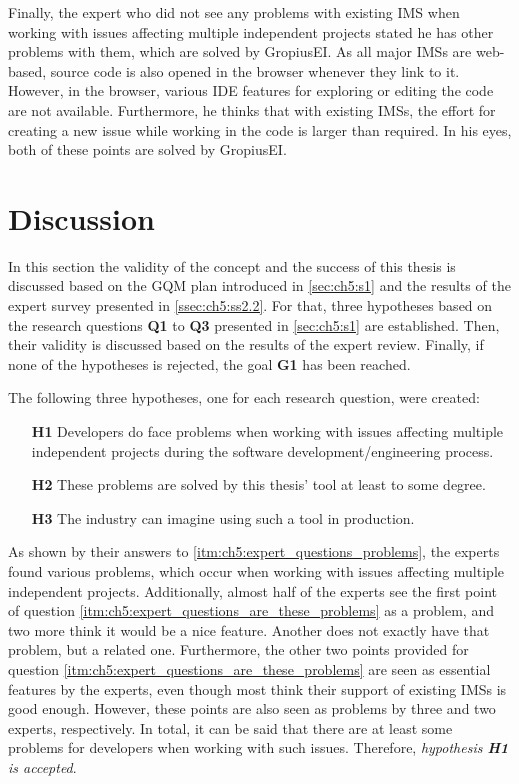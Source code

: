 Finally, the expert who did not see any problems with existing \gls{IMS} when working with issues affecting multiple independent projects stated he has other problems with them, which are solved by \gls{GropiusEI}.
As all major \glspl{IMS} are web-based, source code is also opened in the browser whenever they link to it.
However, in the browser, various \gls{IDE} features for exploring or editing the code are not available.
Furthermore, he thinks that with existing \glspl{IMS}, the effort for creating a new issue while working in the code is larger than required.
In his eyes, both of these points are solved by \gls{GropiusEI}.

\section{Discussion}
\label{sec:ch5:s3}
In this section the validity of the concept and the success of this thesis is discussed based on the \gls{GQM} plan introduced in \cref{sec:ch5:s1} and the results of the expert survey presented in \cref{ssec:ch5:ss2.2}.
For that, three hypotheses based on the research questions \textbf{Q1} to \textbf{Q3} presented in \cref{sec:ch5:s1} are established. 
Then, their validity is discussed based on the results of the expert review.
Finally, if none of the hypotheses is rejected, the goal \textbf{G1} has been reached.

The following three hypotheses, one for each research question, were created:
\begin{itemize}
	\item[\textbf{H1}] Developers do face problems when working with issues affecting multiple independent projects during the software development/engineering process.
	\item[\textbf{H2}] These problems are solved by this thesis' tool at least to some degree.
	\item[\textbf{H3}] The industry can imagine using such a tool in production.
\end{itemize}

As shown by their answers to \ref{itm:ch5:expert_questions_problems}, the experts found various problems, which occur when working with issues affecting multiple independent projects.
Additionally, almost half of the experts see the first point of question \ref{itm:ch5:expert_questions_are_these_problems} as a problem, and two more think it would be a nice feature.
Another does not exactly have that problem, but a related one.
Furthermore, the other two points provided for question \ref{itm:ch5:expert_questions_are_these_problems}  are seen as essential features by the experts, even though most think their support of existing \glspl{IMS} is good enough.
However, these points are also seen as problems by three and two experts, respectively.
In total, it can be said that there are at least some problems for developers when working with such issues.
Therefore, \emph{hypothesis \textbf{H1} is accepted}.

